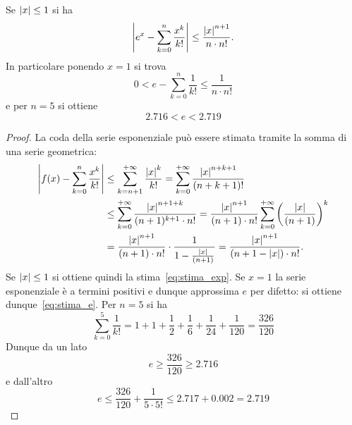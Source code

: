\begin{theorem}
  \label{th:approx_exp}%
  \label{th:approx_e}%
  Se ${\left|x\right|}\le 1$ si ha 
  \begin{equation}\label{eq:stima_exp}
    {\left|e^x - \sum_{k=0}^n \frac{x^k}{k!}\right|}
    \le \frac{{\left|x\right|}^{n+1}}{n\cdot n!}.
  \end{equation}
  In particolare ponendo $x=1$ si trova
  \begin{equation}\label{eq:stima_e}
     0 < e - \sum_{k=0}^n \frac{1}{k!} \le \frac{1}{n \cdot n!}
  \end{equation}
  e per $n=5$ si ottiene
  \begin{equation}
    2.716 < e < 2.719
  \end{equation}
  \end{theorem}
  \begin{proof}
  La coda della serie esponenziale può essere stimata 
  tramite la somma di una serie geometrica:
  \begin{align*}
    {\left|f(x) - \sum_{k=0}^n \frac {x^k} {k!}\right|}
    & \le \sum_{k=n+1}^{+\infty} \frac{{\left|x\right|}^k}{k!} 
     = \sum_{k=0}^{+\infty}\frac{{\left|x\right|}^{n+k+1}}{(n+k+1)!} \\
    & \le \sum_{k=0}^{+\infty}\frac{{\left|x\right|}^{n+1+k}}{(n+1)^{k+1}\cdot n!}
     = \frac{{\left|x\right|}^{n+1}}{(n+1)\cdot n!}\sum_{k=0}^{+\infty} {\left( \frac{{\left|x\right|}}{(n+1)} \right)}^k \\
    & = \frac{{\left|x\right|}^{n+1}}{(n+1)\cdot n!} \cdot \frac{1}{1-\frac{{\left|x\right|}}{(n+1)}} 
     = \frac{{\left|x\right|}^{n+1}}{(n+1-{\left|x\right|})\cdot n!}.
  \end{align*}
  Se ${\left|x\right|}\le 1$ si ottiene quindi la stima~\eqref{eq:stima_exp}.
  Se $x=1$ la serie esponenziale è a termini positivi e dunque 
  approssima $e$ per difetto: si ottiene dunque~\eqref{eq:stima_e}.
  Per $n=5$ si ha
  \[
   \sum_{k=0}^5 \frac{1}{k!} = 1 + 1 + \frac 1 2 + \frac{1}{6} + \frac {1}{24} + \frac{1}{120}
   = \frac{326}{120}
  \]
  Dunque da un lato
  \[
    e \ge \frac{326}{120} \ge 2.716
  \]
  e dall'altro
  \[
   e \le \frac{326}{120} + \frac{1}{5\cdot 5!}
     \le 2.717 + 0.002 = 2.719
  \]
\end{proof}
  
